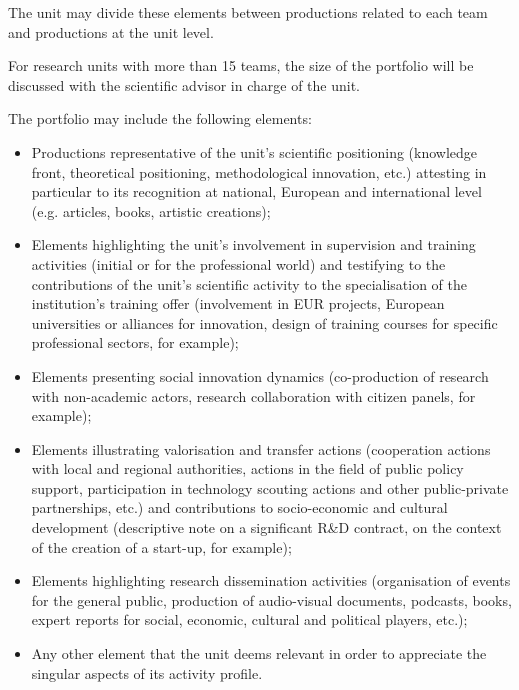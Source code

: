 \begin{hceresinstructions}
  The unit may divide these elements between productions related to each
  team and productions at the unit level.

  For research units with more than 15 teams, the size of the portfolio
  will be discussed with the scientific advisor in charge of the unit.

  The portfolio may include the following elements:

  \begin{itemize}
  \item
    Productions representative of the unit's scientific
    positioning (knowledge front, theoretical positioning, methodological
    innovation, etc.) attesting in particular to its recognition at
    national, European and international level (e.g. articles, books,
    artistic creations);
  \item
    Elements highlighting the unit's involvement in
    supervision and training activities (initial or for the professional
    world) and testifying to the contributions of the
    unit's scientific activity to the specialisation of
    the institution's training offer (involvement in EUR
    projects, European universities or alliances for innovation, design of
    training courses for specific professional sectors, for example);
  \item
    Elements presenting social innovation dynamics (co-production of
    research with non-academic actors, research collaboration with citizen
    panels, for example);
  \item
    Elements illustrating valorisation and transfer actions (cooperation
    actions with local and regional authorities, actions in the field of
    public policy support, participation in technology scouting actions
    and other public-private partnerships, etc.) and contributions to
    socio-economic and cultural development (descriptive note on a
    significant R\&D contract, on the context of the creation of a
    start-up, for example);
  \item
    Elements highlighting research dissemination activities (organisation
    of events for the general public, production of audio-visual
    documents, podcasts, books, expert reports for social, economic,
    cultural and political players, etc.);
  \item
    Any other element that the unit deems relevant in order to appreciate
    the singular aspects of its activity profile.
  \end{itemize}
\end{hceresinstructions}
